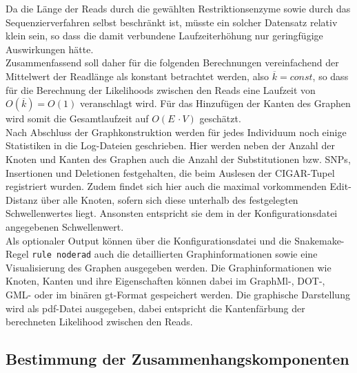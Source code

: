 Da die Länge der Reads durch die gewählten Restriktionsenzyme sowie durch das Sequenzierverfahren selbst beschränkt ist, müsste ein solcher Datensatz relativ klein sein, so dass die damit verbundene Laufzeiterhöhung nur geringfügige Auswirkungen hätte. \\

Zusammenfassend soll daher für die folgenden Berechnungen vereinfachend der Mittelwert der Readlänge als konstant betrachtet werden, also $\overline{k}=const$, so dass für die Berechnung der Likelihoods zwischen den Reads eine Laufzeit von $O(\overline{k}) = O(1)$ veranschlagt wird. Für das Hinzufügen der Kanten des Graphen wird somit die Gesamtlaufzeit auf $ O(E\, \cdotp V) $ geschätzt.\\

Nach Abschluss der Graphkonstruktion werden für jedes Individuum noch einige Statistiken in die Log-Dateien geschrieben. Hier werden neben der Anzahl der Knoten und Kanten des Graphen auch die Anzahl der Substitutionen bzw. SNPs, Insertionen und Deletionen festgehalten, die beim Auslesen der CIGAR-Tupel registriert wurden. Zudem findet sich hier auch die maximal vorkommenden Edit-Distanz über alle Knoten, sofern sich diese unterhalb des festgelegten Schwellenwertes liegt. Ansonsten entspricht sie dem in der Konfigurationsdatei angegebenen Schwellenwert.\\

Als optionaler Output können über die Konfigurationsdatei und die Snakemake-Regel \lstinline|rule noderad| auch die detaillierten Graphinformationen sowie eine Visualisierung des Graphen ausgegeben werden. Die Graphinformationen wie Knoten, Kanten und ihre Eigenschaften können dabei im GraphMl-, DOT-, GML- oder im binären gt-Format gespeichert werden. Die graphische Darstellung wird als pdf-Datei ausgegeben, dabei entspricht die Kantenfärbung der berechneten Likelihood zwischen den Reads. \\

\subsection{Bestimmung der Zusammenhangskomponenten} \label{subsec:comp}

